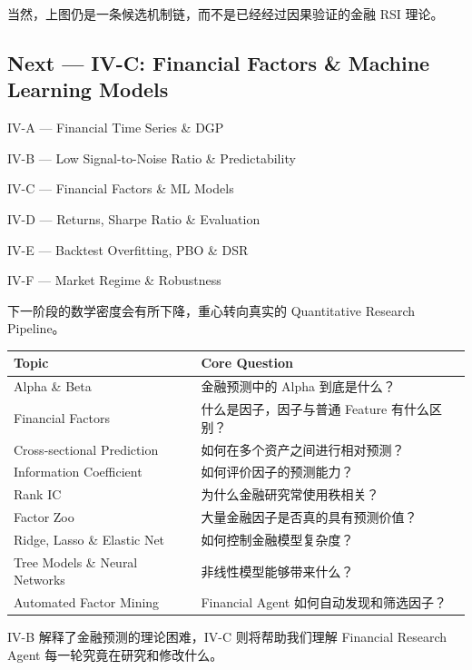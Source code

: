 当然，上图仍是一条候选机制链，而不是已经经过因果验证的金融 RSI 理论。

\hypertarget{part-4-60-0001-next-iv-c-financial-factors-machine-learning-models}{%
\subsection{Next --- IV-C: Financial Factors \& Machine Learning Models}\label{part-4-60-0001-next-iv-c-financial-factors-machine-learning-models}}

IV-A --- Financial Time Series \& DGP

IV-B --- Low Signal-to-Noise Ratio \& Predictability

IV-C --- Financial Factors \& ML Models

IV-D --- Returns, Sharpe Ratio \& Evaluation

IV-E --- Backtest Overfitting, PBO \& DSR

IV-F --- Market Regime \& Robustness

下一阶段的数学密度会有所下降，重心转向真实的 Quantitative Research Pipeline。

\begin{readertable}
\begin{longtable}[]{@{}
  >{\raggedright\arraybackslash}p{}
  >{\raggedright\arraybackslash}p{}@{}}
\toprule
Topic & Core Question \\
\midrule
\endhead
Alpha \& Beta & 金融预测中的 Alpha 到底是什么？ \\
Financial Factors & 什么是因子，因子与普通 Feature 有什么区别？ \\
Cross-sectional Prediction & 如何在多个资产之间进行相对预测？ \\
Information Coefficient & 如何评价因子的预测能力？ \\
Rank IC & 为什么金融研究常使用秩相关？ \\
Factor Zoo & 大量金融因子是否真的具有预测价值？ \\
Ridge, Lasso \& Elastic Net & 如何控制金融模型复杂度？ \\
Tree Models \& Neural Networks & 非线性模型能够带来什么？ \\
Automated Factor Mining & Financial Agent 如何自动发现和筛选因子？ \\
\bottomrule
\end{longtable}
\end{readertable}

IV-B 解释了金融预测的理论困难，IV-C 则将帮助我们理解 Financial Research Agent 每一轮究竟在研究和修改什么。
